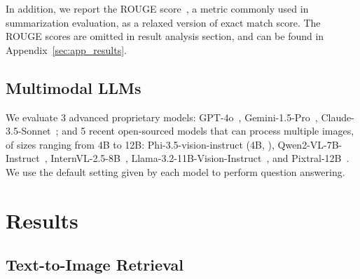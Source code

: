 In addition, we report the ROUGE score~\citep{lin-2004-rouge}, a metric commonly used in summarization evaluation, as a relaxed version of exact match score. The ROUGE scores are omitted in result analysis section, and can be found in Appendix~\ref{sec:app_results}. %

\subsection{Multimodal LLMs}
We evaluate 3 advanced proprietary models: GPT-4o~\citep{openai_chatgpt_2024}, Gemini-1.5-Pro~\citep{gemini}, Claude-3.5-Sonnet~\citep{claude}; and 5 recent open-sourced models that can process multiple images, of sizes ranging from 4B to 12B: Phi-3.5-vision-instruct (4B, \citealp{abdin2024phi3technicalreporthighly}), Qwen2-VL-7B-Instruct~\citep{Qwen2VL}, InternVL-2.5-8B~\citep{chen2024expandingperformanceboundariesopensource}, Llama-3.2-11B-Vision-Instruct~\citep{grattafiori2024llama3herdmodels}, and Pixtral-12B~\citep{pixtral}. We use the default setting given by each model to perform question answering.


\section{Results}
\subsection{Text-to-Image Retrieval}
\label{sec:ret_result}
\vspace{-0.5em}

